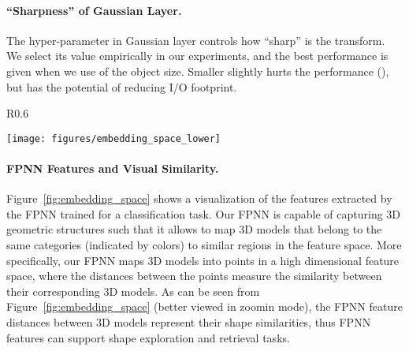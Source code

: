 \documentclass{article}
\begin{document}
\paragraph{``Sharpness'' of Gaussian Layer.} The  hyper-parameter in Gaussian layer controls how ``sharp'' is the transform. We select its value empirically in our experiments, and the best performance is given when we use  of the object size. Smaller  slightly hurts the performance (), but has the potential of reducing I/O footprint.

\begin{wrapfigure}{R}{0.6\linewidth}
	\vspace{-1.5cm}
	\begin{center}
		\texttt{[image: figures/embedding\_space\_lower]}
	\end{center}
	\vspace{-0.5cm}
	\caption{t-SNE visualization of FPNN features.}
	\label{fig:embedding_space}
	\vspace{-0.4cm}
\end{wrapfigure}

\paragraph{FPNN Features and Visual Similarity.} Figure~\ref{fig:embedding_space} shows a visualization of the features extracted by the FPNN trained for a classification task. Our FPNN is capable of capturing 3D geometric structures such that it allows to map 3D models that belong to the same categories (indicated by colors) to similar regions in the feature space. More specifically, our FPNN maps 3D models into points in a high dimensional feature space, where the distances between the points measure the similarity between their corresponding 3D models. As can be seen from Figure~\ref{fig:embedding_space} (better viewed in zoomin mode),  the FPNN feature distances between 3D models represent their shape similarities, thus FPNN features can support shape exploration and retrieval tasks.
\end{document}
